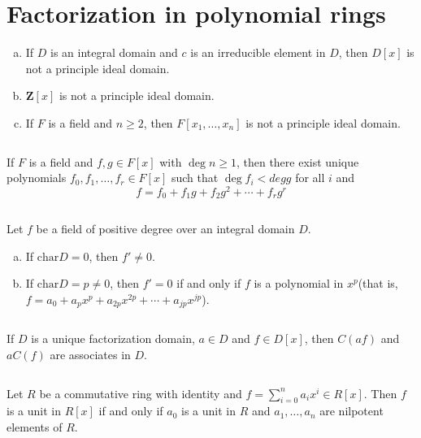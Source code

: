 \section{Factorization in polynomial rings}
\begin{ex}
    \begin{enumerate}[(a)]
        \item If $D$ is an integral domain and $c$ is an irreducible element in $D$, then $D[x]$ is not a principle ideal domain.
        \item $\mathbf{Z}[x]$ is not a principle ideal domain.
        \item If $F$ is a field and $n\geq 2$, then $F[x_{1},\dots,x_{n}]$ is not a principle ideal domain.
    \end{enumerate}
\end{ex}

$$ $$

\begin{ex}
    If $F$ is a field and $f,g\in F[x]$ with $\deg n\geq 1$, then there exist unique polynomials $f_{0}, f_{1},\dots, f_{r}\in F[x]$ such that $\deg f_{i}<deg g$ for all $i$ and \[f=f_{0}+f_{1}g+f_{2}g^{2}+\cdots+f_{r}g^{r}\]
\end{ex}

$$ $$

\begin{ex}
    Let $f$ be a field of positive degree over an integral domain $D$.
    \begin{enumerate}[(a)]
        \item If $\mathrm{char} D=0$, then $f'\neq 0$.
        \item If $\mathrm{char} D=p\neq 0$, then $f'=0$ if and only if $f$ is a polynomial in $x^{p}$(that is, $f=a_{0}+a_{p}x^{p}+a_{2p}x^{2p}+\cdots+a_{jp}x^{jp}$).
    \end{enumerate}
\end{ex}

$$ $$

\begin{ex}
    If $D$ is a unique factorization domain, $a\in D$ and $f\in D[x]$, then $C(af)$ and $aC(f)$ are associates in $D$.
\end{ex}

$$ $$

\begin{ex}
    Let $R$ be a commutative ring with identity and $f=\sum\limits_{i=0}^{n}a_{i}x^{i}\in R[x]$. Then $f$ is a unit in $R[x]$ if and only if $a_{0}$ is a unit in $R$ and $a_{1},\dots,a_{n}$ are nilpotent elements of $R$.
\end{ex}

